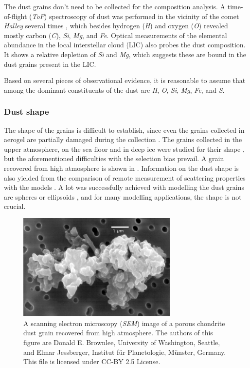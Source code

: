 The dust grains don't need to be collected for the composition analysis. A time-of-flight (\textit{ToF}) spectroscopy of dust was performed in the vicinity of the comet \textit{Halley} several times \citep{jessberger1988aspects}, which besides hydrogen (\textit{H}) and oxygen (\textit{O}) revealed mostly carbon (\textit{C}), \textit{Si}, \textit{Mg}, and \textit{Fe}. Optical measurements of the elemental abundance in the local interstellar cloud (LIC) also probes the dust composition. It shows a relative depletion of \textit{Si} and \textit{Mg}, which suggests these are bound in the dust grains present in the LIC. 

Based on several pieces of observational evidence, it is reasonable to assume that among the dominant constituents of the dust are \textit{H}, \textit{O}, \textit{Si}, \textit{Mg}, \textit{Fe}, and \textit{S}.

\subsubsection{Dust shape}

The shape of the grains is difficult to establish, since even the grains collected in aerogel are partially damaged during the collection \citep{burchell2006cosmic}. The grains collected in the upper atmosphere, on the sea floor and in deep ice were studied for their shape \citep{jessberger2001properties}, but the aforementioned difficulties with the selection bias prevail. A grain recovered from high atmosphere is shown in . Information on the dust shape is also yielded from the comparison of remote measurement of scattering properties with the models \citep{min2005modeling}. A lot was successfully achieved with modelling the dust grains are spheres or ellipsoids \citep{mann2010interstellar}, and for many modelling applications, the shape is not crucial.

\begin{figure}[h]
 	\centering
 	\includegraphics[width=8cm]{figures/grain.jpg}
 	\caption{A scanning electron microscopy (\textit{SEM}) image of a porous chondrite dust grain recovered from high atmosphere.  The authors of this figure are Donald E. Brownlee, University of Washington, Seattle, and Elmar Jessberger, Institut für Planetologie, Münster, Germany.
This file is licensed under CC-BY 2.5 License.}
 	\label{fig:dust_grain}
\end{figure}

